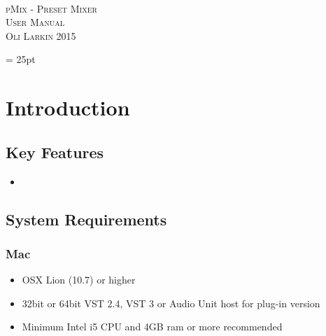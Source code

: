 \documentclass[a4paper,14pt]{report}
\begin{document}
\begin{titlepage}~\\[4cm]
\begin{center}
\textsc{\huge pMix - Preset Mixer}\\[2cm]
\textsc{\LARGE User Manual}\\[1cm]
\textsc{Oli Larkin 2015}\\[8cm]
\end{center}
\end{titlepage}
\large

\marginparwidth = 25pt

\tableofcontents
\setcounter{tocdepth}{1}


\chapter{Introduction}


\section{Key Features}

\begin{itemize}
\item 
\end{itemize}

\section{System Requirements}

\subsection*{Mac}
\begin{itemize}
\item OSX Lion (10.7) or higher
\item 32bit or 64bit VST 2.4, VST 3 or Audio Unit host for plug-in version
\item Minimum Intel i5 CPU and 4GB ram or more recommended
\end{itemize}
\end{document}
